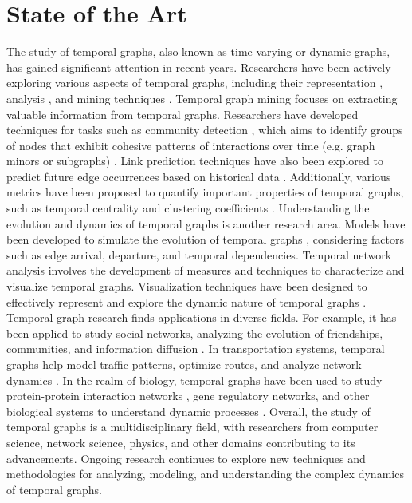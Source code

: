 \section{State of the Art}
\label{ch:prelimiaries:state-of-the-art}
The study of temporal graphs, also known as time-varying or dynamic graphs, has gained significant attention in recent years. Researchers have been actively exploring various aspects of temporal graphs, including their representation \cite{Holme_2012}, analysis \cite{DBLP:journals/corr/Erlebach0K15}\cite{DBLP:journals/corr/Michail15}, and mining techniques \cite{temporal-mining-oettershagen2022tglib}. Temporal graph mining focuses on extracting valuable information from temporal graphs. Researchers have developed techniques for tasks such as community detection \cite{temporal-comunity-detection-8861143}, which aims to identify groups of nodes that exhibit cohesive patterns of interactions over time (e.g. graph minors or subgraphs) \cite{arrighi2022multiparameter}. Link prediction techniques have also been explored to predict future edge occurrences based on historical data \cite{temporalLinkPrediction}. Additionally, various metrics have been proposed to quantify important properties of temporal graphs, such as temporal centrality and clustering coefficients \cite{temporalClusterCoefficient}. Understanding the evolution and dynamics of temporal graphs is another research area. Models have been developed to simulate the evolution of temporal graphs \cite{temporalEvolution}, considering factors such as edge arrival, departure, and temporal dependencies. Temporal network analysis involves the development of measures and techniques to characterize and visualize temporal graphs. Visualization techniques have been designed to effectively represent and explore the dynamic nature of temporal graphs \cite{kerracher2014design}. Temporal graph research finds applications in diverse fields. For example, it has been applied to study social networks, analyzing the evolution of friendships, communities, and information diffusion \cite{temporal-friends}\cite{temporal-information-diffusion}. In transportation systems, temporal graphs help model traffic patterns, optimize routes, and analyze network dynamics \cite{tang2009temporal}. In the realm of biology, temporal graphs have been used to study protein-protein interaction networks \cite{fu2022dppin}, gene regulatory networks, and other biological systems to understand dynamic processes \cite{dibrita2022temporal}. Overall, the study of temporal graphs is a multidisciplinary field, with researchers from computer science, network science, physics, and other domains contributing to its advancements. Ongoing research continues to explore new techniques and methodologies for analyzing, modeling, and understanding the complex dynamics of temporal graphs.

